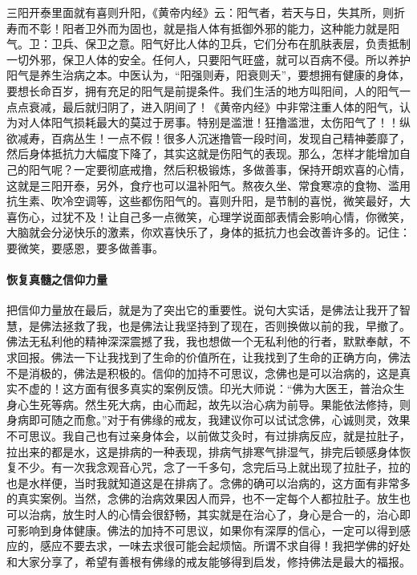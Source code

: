 \documentclass{ctexart}
\begin{document}
三阳开泰里面就有喜则升阳，《黄帝内经》云：阳气者，若天与日，失其所，则折寿而不彰！阳者卫外而为固也，就是指人体有抵御外邪的能力，这种能力就是阳气。卫：卫兵、保卫之意。阳气好比人体的卫兵，它们分布在肌肤表层，负责抵制一切外邪，保卫人体的安全。任何人，只要阳气旺盛，就可以百病不侵。所以养护阳气是养生治病之本。中医认为，“阳强则寿，阳衰则夭”，要想拥有健康的身体，要想长命百岁，拥有充足的阳气是前提条件。我们生活的地方叫阳间，人的阳气一点点衰减，最后就归阴了，进入阴间了！《黄帝内经》中非常注重人体的阳气，认为对人体阳气损耗最大的莫过于房事。特别是滥泄！狂撸滥泄，太伤阳气了！！纵欲减寿，百病丛生！一点不假！很多人沉迷撸管一段时间，发现自己精神萎靡了，然后身体抵抗力大幅度下降了，其实这就是伤阳气的表现。那么，怎样才能增加自己的阳气呢？一定要彻底戒撸，然后积极锻炼，多做善事，保持开朗欢喜的心情，这就是三阳开泰，另外，食疗也可以温补阳气。熬夜久坐、常食寒凉的食物、滥用抗生素、吹冷空调等，这些都伤阳气的。喜则升阳，是节制的喜悦，微笑最好，大喜伤心，过犹不及！让自己多一点微笑，心理学说面部表情会影响心情，你微笑，大脑就会分泌快乐的激素，你欢喜快乐了，身体的抵抗力也会改善许多的。记住：要微笑，要感恩，要多做善事。

\paragraph{恢复真髓之信仰力量}

把信仰力量放在最后，就是为了突出它的重要性。说句大实话，是佛法让我开了智慧，是佛法拯救了我，也是佛法让我坚持到了现在，否则换做以前的我，早撤了。佛法无私利他的精神深深震撼了我，我也想做一个无私利他的行者，默默奉献，不求回报。佛法一下让我找到了生命的价值所在，让我找到了生命的正确方向，佛法不是消极的，佛法是积极的。信仰的加持不可思议，念佛也是可以治病的，这是真实不虚的！这方面有很多真实的案例反馈。印光大师说：“佛为大医王，普治众生身心生死等病。然生死大病，由心而起，故先以治心病为前导。果能依法修持，则身病即可随之而愈。”对于有佛缘的戒友，我建议你可以试试念佛，心诚则灵，效果不可思议。我自己也有过亲身体会，以前做艾灸时，有过排病反应，就是拉肚子，拉出来的都是水，这是排病的一种表现，排病气排寒气排湿气，排完后顿感身体恢复不少。有一次我念观音心咒，念了一千多句，念完后马上就出现了拉肚子，拉的也是水样便，当时我就知道这是在排病了。念佛的确可以治病的，这方面有非常多的真实案例。当然，念佛的治病效果因人而异，也不一定每个人都拉肚子。放生也可以治病，放生时人的心情会很舒畅，其实就是在治心了，身心是合一的，治心即可影响到身体健康。佛法的加持不可思议，如果你有深厚的信心，一定可以得到感应的，感应不要去求，一味去求很可能会起烦恼。所谓不求自得！我把学佛的好处和大家分享了，希望有善根有佛缘的戒友能够得到启发，修持佛法是最大的福报。
\end{document}
